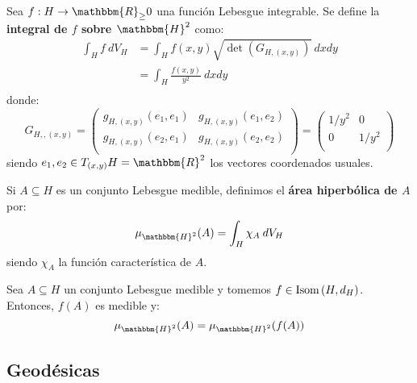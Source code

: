 \documentclass[12pt]{report}
\theoremstyle{largebreak}
\newcommand\cf[3]{\ensuremath{#1:#2\rightarrow#3}}
\newcommand{\bbm}[1]{\ensuremath{\mathbbm{#1}}}
\newcommand{\Isom}[1]{\ensuremath{\textup{Isom}\left(#1\right)}}
\begin{document}
    \begin{mydef}
        Sea $\cf{f}{H}{\bbm{R}_\geq0}$ una función Lebesgue integrable. Se define la \textbf{integral de $f$ sobre $\bbm{H}^2$} como:
        \begin{equation*}
            \begin{split}
                \int_{H}f\:dV_H&=\int_{H}f(x,y)\sqrt{\det(G_{H,(x,y)})}\:dxdy\\
                &=\int_{H}\frac{f(x,y)}{y^2}\:dxdy\\
            \end{split}
        \end{equation*}
        donde:
        \begin{equation*}
            G_{ H,,(x,y)}=\left(\begin{array}{cc}
                g_{ H,(x,y)}(e_1,e_1) & g_{ H,(x,y)}(e_1,e_2) \\
                g_{ H,(x,y)}(e_2,e_1) & g_{ H,(x,y)}(e_2,e_2) \\
            \end{array} \right)=\left(\begin{array}{cc}
                1/y^2 & 0 \\
                0 & 1/y^2 \\
            \end{array} \right)
        \end{equation*}
        siendo $e_1,e_2\in T_{(x,y)}H=\bbm{R}^2$ los vectores coordenados usuales.

        Si $A\subseteq H$ es un conjunto Lebesgue medible, definimos el \textbf{área hiperbólica de $A$} por:
        \begin{equation*}
            \mu_{\bbm{H}^2}(A)=\int_{H}\chi_A\:dV_H
        \end{equation*}
        siendo $\chi_A$ la función característica de $A$.
    \end{mydef}

    \begin{propo}
        Sea $A\subseteq H$ un conjunto Lebesgue medible y tomemos $f\in\Isom{H,d_H}$. Entonces, $f(A)$ es medible y:
        \begin{equation*}
            \mu_{\bbm{H}^2}(A)=\mu_{\bbm{H}^2}(f(A))
        \end{equation*}
    \end{propo}

    \subsection{Geodésicas}
\end{document}
